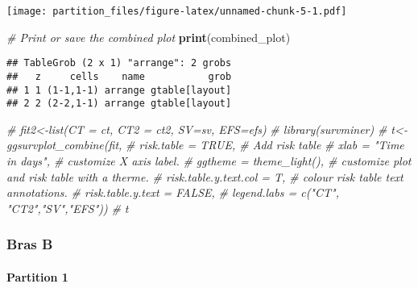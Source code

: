\documentclass[
]{article}
\newenvironment{Shaded}{\begin{snugshade}}{\end{snugshade}}
\newcommand{\CommentTok}[1]{\textcolor[rgb]{0.56,0.35,0.01}{\textit{#1}}}
\newcommand{\FunctionTok}[1]{\textcolor[rgb]{0.13,0.29,0.53}{\textbf{#1}}}
\newcommand{\NormalTok}[1]{#1}
\begin{document}
\texttt{[image: partition\_files/figure-latex/unnamed-chunk-5-1.pdf]}

\begin{Shaded}
\begin{Highlighting}[]
\CommentTok{\# Print or save the combined plot}
\FunctionTok{print}\NormalTok{(combined\_plot)}
\end{Highlighting}
\end{Shaded}

\begin{verbatim}
## TableGrob (2 x 1) "arrange": 2 grobs
##   z     cells    name           grob
## 1 1 (1-1,1-1) arrange gtable[layout]
## 2 2 (2-2,1-1) arrange gtable[layout]
\end{verbatim}

\begin{Shaded}
\begin{Highlighting}[]
\CommentTok{\# fit2\textless{}{-}list(CT = ct, CT2 = ct2, SV=sv, EFS=efs)}
\CommentTok{\# library(survminer)}
\CommentTok{\# t\textless{}{-}ggsurvplot\_combine(fit,}
\CommentTok{\#           risk.table = TRUE,                  \# Add risk table}
\CommentTok{\#    xlab = "Time in days",   \# customize X axis label.}
\CommentTok{\#    ggtheme = theme\_light(), \# customize plot and risk table with a therme.}
\CommentTok{\#  risk.table.y.text.col = T, \# colour risk table text annotations.}
\CommentTok{\#   risk.table.y.text = FALSE,}
\CommentTok{\#   legend.labs = c("CT", "CT2","SV","EFS"))}
\CommentTok{\# t}
\end{Highlighting}
\end{Shaded}

\hypertarget{bras-b}{%
\subsubsection{Bras B}\label{bras-b}}

\hypertarget{partition-1-1}{%
\paragraph{Partition 1}\label{partition-1-1}}
\end{document}

